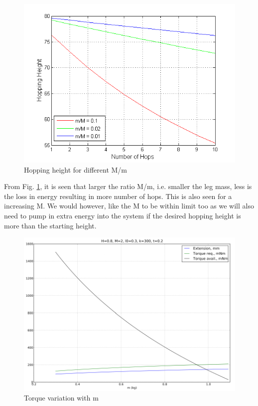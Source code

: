\begin{figure}[!h]
\centering
\includegraphics[scale=0.8]{fig/2mass_hopheight.png}
\caption{Hopping height for different M/m}
\label{fig:4_hopping_height}
\end{figure}
From Fig. \ref{fig:4_hopping_height}, it is seen that larger the ratio M/m, i.e. smaller the leg
mass, less is the loss in energy resulting in more number of hops. This is also seen for a increasing M. We would however,
like the M to be within limit too as we will also need to pump in extra energy into the system if the desired hopping
height is more than the starting height.\\
\begin{figure}[!h]
\centering
\includegraphics[scale=0.6]{fig/2mass_m.pdf}
\caption{Torque variation with m}
\label{fig:4_torque2mass}
\end{figure}

